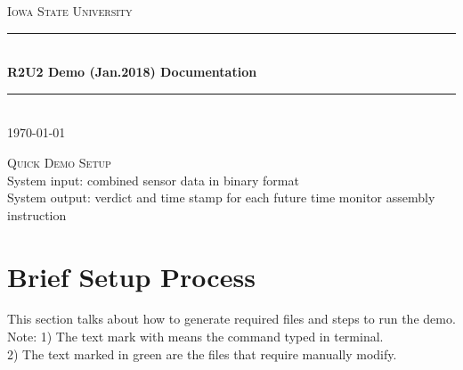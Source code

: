 \documentclass{article}
\theoremstyle{definition}
\begin{document}
\begin{titlepage}
	\newcommand{\HRule}{\rule{\linewidth}{0.5mm}}
	\center %
	\textsc{\LARGE Iowa State University}\\[1.5cm]
	\HRule\\[0.4cm]
	{\huge\bfseries R2U2 Demo (Jan.2018) Documentation}\\[0.4cm]
	\HRule\\[1.5cm]
	\vfill\vfill\vfill
	{\large\today}
	\vfill 
\end{titlepage}

\begin{titlepage}
	\newcommand{\HRule}{\rule{\linewidth}{0.5mm}}
	\center %
	\textsc{\LARGE Quick Demo Setup}\\[1.5cm]
	System input: combined sensor data in binary format\\
	System output: verdict and time stamp for each future time monitor assembly instruction
\end{titlepage}

\section{Brief Setup Process}
This section talks about how to generate required files and steps to run the demo. \\
Note: 1) The text mark with \colorbox{blue!30}{\hspace{0.5cm}} means the command typed in terminal.\\
2) The text marked in \textcolor{green!100}{green} are the files that require manually modify.
\end{document}
